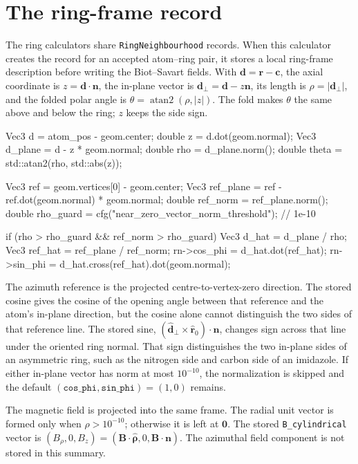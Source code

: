 \documentclass[11pt]{article}
\newcommand{\code}[1]{\texttt{#1}}
\begin{document}
\section{The ring-frame record}

The ring calculators share \code{RingNeighbourhood} records. When this
calculator creates the record for an accepted atom--ring pair, it stores a local
ring-frame description before writing the Biot--Savart fields. With
\(\bm d=\bm r-\bm c\), the axial coordinate is \(z=\bm d\cdot\bm n\), the
in-plane vector is \(\bm d_\perp=\bm d-z\bm n\), its length is
\(\rho=|\bm d_\perp|\), and the folded polar angle is
\(\theta=\operatorname{atan2}(\rho, |z|)\). The fold makes \(\theta\) the same
above and below the ring; \(z\) keeps the side sign.

\begin{codebox}
Vec3 d = atom_pos - geom.center;
double z = d.dot(geom.normal);
Vec3 d_plane = d - z * geom.normal;
double rho = d_plane.norm();
double theta = std::atan2(rho, std::abs(z));

Vec3 ref = geom.vertices[0] - geom.center;
Vec3 ref_plane = ref - ref.dot(geom.normal) * geom.normal;
double ref_norm = ref_plane.norm();
double rho_guard = cfg("near_zero_vector_norm_threshold");  // 1e-10

if (rho > rho_guard && ref_norm > rho_guard) {
    Vec3 d_hat = d_plane / rho;
    Vec3 ref_hat = ref_plane / ref_norm;
    rn->cos_phi = d_hat.dot(ref_hat);
    rn->sin_phi = d_hat.cross(ref_hat).dot(geom.normal);
}
\end{codebox}

The azimuth reference is the projected centre-to-vertex-zero direction. The
stored cosine gives the cosine of the opening angle between that reference and
the atom's in-plane direction, but the cosine alone cannot distinguish the two
sides of that reference line. The stored sine,
\((\hat{\bm d}_\perp\times\hat{\bm r}_0)\cdot\bm n\), changes sign across that
line under the oriented ring normal. That sign distinguishes the two in-plane
sides of an asymmetric ring, such as the nitrogen side and carbon side of an
imidazole. If either in-plane vector has norm at most \(10^{-10}\), the
normalization is skipped and the default
\((\code{cos\_phi},\code{sin\_phi})=(1,0)\) remains.

The magnetic field is projected into the same frame. The radial unit vector is
formed only when \(\rho>10^{-10}\); otherwise it is left at \(\bm0\). The stored
\code{B\_cylindrical} vector is
\((B_\rho,0,B_z)=(\bm B\cdot\hat{\bm\rho},0,\bm B\cdot\bm n)\). The azimuthal
field component is not stored in this summary.
\end{document}
